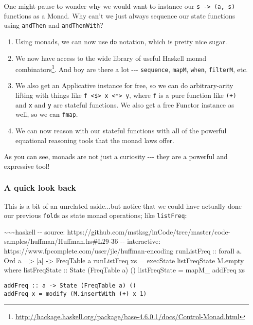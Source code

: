 \documentclass[]{article}
\renewcommand{\href}[2]{#2\footnote{\url{#1}}}
\begin{document}
One might pause to wonder why we would want to instance our
\texttt{s\ -\textgreater{}\ (a,\ s)} functions as a Monad. Why can't we just
always sequence our state functions using \texttt{andThen} and
\texttt{andThenWith}?

\begin{enumerate}
\item
  Using monads, we can now use \texttt{do} notation, which is pretty nice sugar.
\item
  We now have access to the wide library of useful Haskell
  \href{http://hackage.haskell.org/package/base-4.6.0.1/docs/Control-Monad.html}{monad
  combinators}. And boy are there a lot -\/-\/- \texttt{sequence},
  \texttt{mapM}, \texttt{when}, \texttt{filterM}, etc.
\item
  We also get an Applicative instance for free, so we can do arbitrary-arity
  lifting with things like
  \texttt{f\ \textless{}\$\textgreater{}\ x\ \textless{}*\textgreater{}\ y},
  where \texttt{f} is a pure function like \texttt{(+)} and \texttt{x} and
  \texttt{y} are stateful functions. We also get a free Functor instance as
  well, so we can \texttt{fmap}.
\item
  We can now reason with our stateful functions with all of the powerful
  equational reasoning tools that the monad laws offer.
\end{enumerate}

As you can see, monads are not just a curiosity -\/-\/- they are a powerful and
expressive tool!

\subsubsection{A quick look back}

This is a bit of an unrelated aside...but notice that we could have actually
done our previous \texttt{fold}s as state monad operations; like
\texttt{listFreq}:

\textasciitilde{}\textasciitilde{}\textasciitilde{}haskell -\/- source:
https://github.com/mstksg/inCode/tree/master/code-samples/huffman/Huffman.hs\#L29-36
-\/- interactive: https://www.fpcomplete.com/user/jle/huffman-encoding
runListFreq :: forall a. Ord a =\textgreater{} {[}a{]} -\textgreater{} FreqTable
a runListFreq xs = execState listFreqState M.empty where listFreqState :: State
(FreqTable a) () listFreqState = mapM\_ addFreq xs

\begin{verbatim}
addFreq :: a -> State (FreqTable a) ()
addFreq x = modify (M.insertWith (+) x 1)
\end{verbatim}
\end{document}
